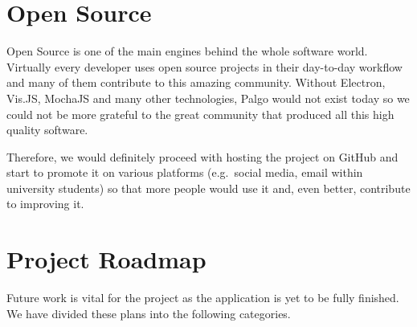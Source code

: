 \documentclass{l4proj}
\begin{document}
\section{Open Source}

Open Source is one of the main engines behind the whole software world. Virtually every developer uses open source projects in
their day-to-day workflow and many of them contribute to this amazing community. Without Electron, Vis.JS, MochaJS
and many other technologies, Palgo would not exist today so we could not be more grateful to the great community
that produced all this high quality software.

Therefore, we would definitely proceed with hosting the project on GitHub and start to promote it on various platforms
(e.g.\ social media, email within university students) so that more people would use it and, even better, contribute to
improving it.

\section{Project Roadmap}

Future work is vital for the project as the application is yet to be fully finished. We have divided these plans into
the following categories.
\end{document}
